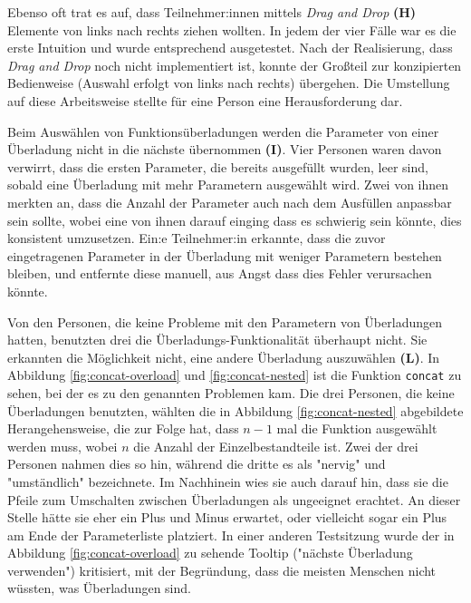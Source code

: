 Ebenso oft trat es auf, dass Teilnehmer:innen mittels \textit{Drag and Drop} \textbf{(H)} Elemente von links nach rechts ziehen wollten. In jedem der vier Fälle war es die erste Intuition und wurde entsprechend ausgetestet. Nach der Realisierung, dass \textit{Drag and Drop} noch nicht implementiert ist, konnte der Großteil zur konzipierten Bedienweise (Auswahl erfolgt von links nach rechts) übergehen. Die Umstellung auf diese Arbeitsweise stellte für eine Person eine Herausforderung dar.

Beim Auswählen von Funktionsüberladungen werden die Parameter von einer Überladung nicht in die nächste übernommen \textbf{(I)}. Vier Personen waren davon verwirrt, dass die ersten Parameter, die bereits ausgefüllt wurden, leer sind, sobald eine Überladung mit mehr Parametern ausgewählt wird. Zwei von ihnen merkten an, dass die Anzahl der Parameter auch nach dem Ausfüllen anpassbar sein sollte, wobei eine von ihnen darauf einging dass es schwierig sein könnte, dies konsistent umzusetzen. Ein:e Teilnehmer:in erkannte, dass die zuvor eingetragenen Parameter in der Überladung mit weniger Parametern bestehen bleiben, und entfernte diese manuell, aus Angst dass dies Fehler verursachen könnte.

Von den Personen, die keine Probleme mit den Parametern von Überladungen hatten, benutzten drei die Überladungs-Funktionalität überhaupt nicht. Sie erkannten die Möglichkeit nicht, eine andere Überladung auszuwählen \textbf{(L)}. In Abbildung \ref{fig:concat-overload} und \ref{fig:concat-nested} ist die Funktion \texttt{concat} zu sehen, bei der es zu den genannten Problemen kam. Die drei Personen, die keine Überladungen benutzten, wählten die in Abbildung \ref{fig:concat-nested} abgebildete Herangehensweise, die zur Folge hat, dass $n-1$ mal die Funktion ausgewählt werden muss, wobei $n$ die Anzahl der Einzelbestandteile ist. Zwei der drei Personen nahmen dies so hin, während die dritte es als "nervig" und "umständlich" bezeichnete. Im Nachhinein wies sie auch darauf hin, dass sie die Pfeile zum Umschalten zwischen Überladungen als ungeeignet erachtet. An dieser Stelle hätte sie eher ein Plus und Minus erwartet, oder vielleicht sogar ein Plus am Ende der Parameterliste platziert. In einer anderen Testsitzung wurde der in Abbildung \ref{fig:concat-overload} zu sehende Tooltip ("nächste Überladung verwenden") kritisiert, mit der Begründung, dass die meisten Menschen nicht wüssten, was Überladungen sind.

